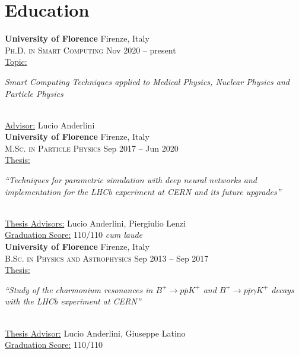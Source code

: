 \newcommand{\university}[2]
  {\large \textbf{\color{hlcolor-0} #1} \hfill {\color{hlcolor-2} #2}}
  
\newcommand{\degree}[2]
  {\small \color{hlcolor-1} 
    {\color{iconcolor} \faGraduationCap} \textsc{#1} \hfill {#2}
  }
  
\newcommand{\worktitle}[2]
  {\normalsize \color{maincolor}
    \ul{#1:}
    \begin{minipage}[t]{0.75\linewidth}
      \begin{flushleft}
        \emph{#2}
      \end{flushleft}
    \end{minipage}
  }


\section*{Education}
\begin{cvcontent}
  \university{University of Florence}{Firenze, Italy}\\
  \degree{Ph.D. in Smart Computing}{Nov 2020 -- present}\\ [1mm]
  \worktitle{Topic}{Smart Computing Techniques applied to Medical
  Physics, Nuclear Physics and Particle Physics}\\ [1.5mm]
  \ul{Advisor:} Lucio Anderlini
  \\ [0.5cm]
  \university{University of Florence}{Firenze, Italy}\\
  \degree{M.Sc. in Particle Physics}{Sep 2017 -- Jun 2020}\\ [1mm]
  \worktitle{Thesis}{``Techniques for parametric simulation with deep neural networks and implementation for the LHCb experiment at CERN
  and its future upgrades''}\\ [1.5mm]
  \ul{Thesis Advisors:} Lucio Anderlini, Piergiulio Lenzi\\ [0.5mm]
  \ul{Graduation Score:} 110/110 \emph{cum laude}
  \\ [0.5cm]
  \university{University of Florence}{Firenze, Italy}\\
  \degree{B.Sc. in Physics and Astrophysics}{Sep 2013 -- Sep 2017}\\ [1mm]
  \worktitle{Thesis}{``Study of the charmonium resonances in 
      $B^+ \to p \bar{p} K^+$ and $B^+ \to p \bar{p} \gamma K^+$
      decays with the LHCb experiment at CERN''}\\ [1.5mm]
  \ul{Thesis Advisor:} Lucio Anderlini, Giuseppe Latino\\ [0.5mm]
  \ul{Graduation Score:} 110/110
\end{cvcontent}